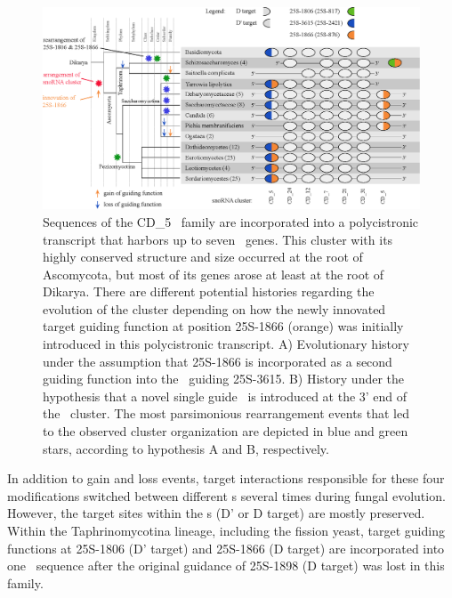 \begin{figure}
  \centering
  \includegraphics[width=\textwidth]{pics/target_switches_CD_5_cluster.eps}
  \caption[Evolution of a \sno\ cluster harboring CD\_5
  sequences.]{Sequences of the CD\_5 \sno\ family are incorporated into
    a polycistronic transcript that harbors up to seven \sno\
    genes. This cluster with its highly conserved structure and size
    occurred at the root of Ascomycota, but most of its genes arose at
    least at the root of Dikarya. There are different potential
    histories regarding the evolution of the cluster depending on how
    the newly innovated target guiding function at position 25S-1866
    (orange) was initially introduced in this polycistronic
    transcript. A) Evolutionary history under the assumption that
    25S-1866 is incorporated as a second guiding function into the
    \sno\ guiding 25S-3615. B) History under the hypothesis that a
    novel single guide \sno\ is introduced at the 3' end of the \sno\
    cluster. The most parsimonious rearrangement events that led to
    the observed cluster organization are depicted in blue and green
    stars, according to hypothesis A and B, respectively.}
\label{fig:CD_5_cluster_history}
\end{figure}

In addition to gain and loss events, target interactions responsible
for these four modifications switched between different \sno s several
times during fungal evolution. However, the target sites within the \sno s (D' or
D target) are mostly preserved. Within the Taphrinomycotina lineage,
including the fission yeast, target guiding functions at 25S-1806 (D'
target) and 25S-1866 (D target) are incorporated into one \sno\
sequence after the original guidance of 25S-1898 (D target) was lost
in this family.


